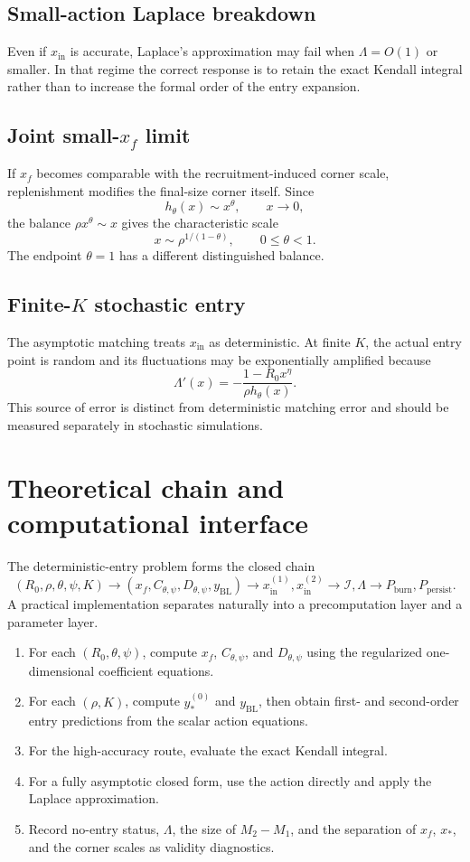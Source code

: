 \documentclass[11pt]{article}
\newcommand{\Rzero}{R_0}
\newcommand{\hth}{h_\theta}
\newcommand{\Cpsi}{C_{\theta,\psi}}
\newcommand{\Dpsi}{D_{\theta,\psi}}
\newcommand{\xf}{x_f}
\newcommand{\xs}{x_*}
\newcommand{\yin}{y_{\mathrm{BL}}}
\newcommand{\xin}{x_{\mathrm{in}}}
\begin{document}
\subsection{Small-action Laplace breakdown}
Even if \(\xin\) is accurate, Laplace's approximation may fail when \(\Lambda=O(1)\) or smaller. In that regime the correct response is to retain the exact Kendall integral rather than to increase the formal order of the entry expansion.

\subsection{Joint small-\texorpdfstring{\(\xf\)}{xf} limit}
If \(\xf\) becomes comparable with the recruitment-induced corner scale, replenishment modifies the final-size corner itself. Since
\[
\hth(x)\sim x^\theta,\qquad x\to0,
\]
the balance \(\rho x^\theta\sim x\) gives the characteristic scale
\[
x\sim\rho^{1/(1-\theta)},
\qquad 0\leq\theta<1.
\]
The endpoint \(\theta=1\) has a different distinguished balance.

\subsection{Finite-\texorpdfstring{\(K\)}{K} stochastic entry}
The asymptotic matching treats \(\xin\) as deterministic. At finite \(K\), the actual entry point is random and its fluctuations may be exponentially amplified because
\[
\Lambda'(x)
=-\frac{1-\Rzero x^\eta}{\rho\hth(x)}.
\]
This source of error is distinct from deterministic matching error and should be measured separately in stochastic simulations.

\section{Theoretical chain and computational interface}
The deterministic-entry problem forms the closed chain
\[
(\Rzero,\rho,\theta,\psi,K)
\longrightarrow
(\xf,\Cpsi,\Dpsi,\yin)
\longrightarrow
\xin^{(1)},\xin^{(2)}
\longrightarrow
\mathcal I,\Lambda
\longrightarrow
P_{\mathrm{burn}},P_{\mathrm{persist}}.
\]
A practical implementation separates naturally into a precomputation layer and a parameter layer.
\begin{enumerate}
\item For each \((\Rzero,\theta,\psi)\), compute \(\xf\), \(\Cpsi\), and \(\Dpsi\) using the regularized one-dimensional coefficient equations.
\item For each \((\rho,K)\), compute \(y_*^{(0)}\) and \(\yin\), then obtain first- and second-order entry predictions from the scalar action equations.
\item For the high-accuracy route, evaluate the exact Kendall integral.
\item For a fully asymptotic closed form, use the action directly and apply the Laplace approximation.
\item Record no-entry status, \(\Lambda\), the size of \(M_2-M_1\), and the separation of \(\xf\), \(\xs\), and the corner scales as validity diagnostics.
\end{enumerate}
\end{document}
